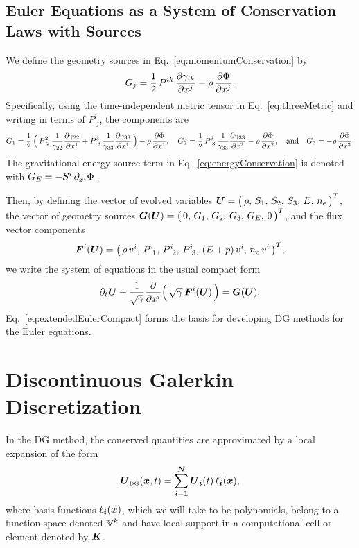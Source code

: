 \documentclass[10pt,preprint]{aastex}
\begin{document}
\subsection{Euler Equations as a System of Conservation Laws with Sources}

We define the geometry sources in Eq.~\eqref{eq:momentumConservation} by
\begin{equation}
  G_{j}
  =\frac{1}{2}\,P^{ik}\,\frac{\partial \gamma_{ik}}{\partial x^{j}}-\rho\,\frac{\partial \Phi}{\partial x^{j}}.  
\end{equation}
Specifically, using the time-independent metric tensor in Eq.~\eqref{eq:threeMetric} and writing in terms of $P^{i}_{~j}$, the components are
\begin{equation}
  G_{1}
  =\frac{1}{2}\,\Big(\,P^{2}_{~2}\,\frac{1}{\gamma_{22}}\frac{\partial \gamma_{22}}{\partial x^{1}}+P^{3}_{~3}\,\frac{1}{\gamma_{33}}\frac{\partial \gamma_{33}}{\partial x^{1}}\,\Big)-\rho\,\frac{\partial \Phi}{\partial x^{1}}, \quad
  G_{2}
  =\frac{1}{2}\,P^{3}_{~3}\,\frac{1}{\gamma_{33}}\frac{\partial \gamma_{33}}{\partial x^{2}}-\rho\,\frac{\partial \Phi}{\partial x^{2}}, \quad\text{and}\quad
  G_{3}
  =-\rho\,\frac{\partial \Phi}{\partial x^{3}}.
\end{equation}
The gravitational energy source term in Eq.~\eqref{eq:energyConservation} is denoted with $G_{E}=-S^{i}\,\partial_{x^{i}}{\Phi}$.  

Then, by defining the vector of evolved variables $\boldsymbol{U}=\big(\,\rho,\,S_{1},\,S_{2},\,S_{3},\,E,\,n_{e}\,\big)^{T}$, the vector of geometry sources $\boldsymbol{G}(\boldsymbol{U})=\big(\,0,\,G_{1},\,G_{2},\,G_{3},\,G_{E},\,0\,\big)^{T}$, and the flux vector components
\begin{equation}
  \boldsymbol{F}^{i}(\boldsymbol{U})
  =\big(\,\rho\,v^{i},\,P_{~1}^{i},\,P_{~2}^{i},\,P_{~3}^{i},\,(E+p)\,v^{i},\,n_{e}\,v^{i}\,\big)^{T},
\end{equation}
we write the system of equations in the usual compact form
\begin{equation}
  \partial_{t}{\boldsymbol{U}}
  +\frac{1}{\sqrt{\gamma}}\frac{\partial }{\partial x^{i}}\Big(\,\sqrt{\gamma}\,\boldsymbol{F}^{i}(\boldsymbol{U})\,\Big)
  =\boldsymbol{G}(\boldsymbol{U}).
  \label{eq:extendedEulerCompact}
\end{equation}
Eq.~\eqref{eq:extendedEulerCompact} forms the basis for developing DG methods for the Euler equations.  

\section{Discontinuous Galerkin Discretization}

In the DG method, the conserved quantities are approximated by a local expansion of the form
\begin{equation}
  \boldsymbol{U}_{\mbox{\tiny DG}}(\boldsymbol{x},t)
  =\sum_{\boldsymbol{i}=\boldsymbol{1}}^{\boldsymbol{N}}\boldsymbol{U}_{\boldsymbol{i}}(t)\,\ell_{\boldsymbol{i}}(\boldsymbol{x}), 
\end{equation}
where basis functions $\ell_{\boldsymbol{i}}(\boldsymbol{x})$, which we will take to be polynomials, belong to a function space denoted $\mathbb{V}^{k}$ and have local support in a computational cell or element denoted by $\boldsymbol{K}$.  
\end{document}
